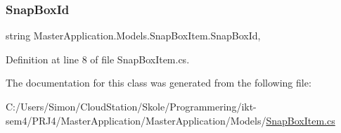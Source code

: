 \subsubsection{\texorpdfstring{Snap\+Box\+Id}{SnapBoxId}}
{\footnotesize\ttfamily string Master\+Application.\+Models.\+Snap\+Box\+Item.\+Snap\+Box\+Id\hspace{0.3cm}{\ttfamily [get]}, {\ttfamily [set]}}



Definition at line 8 of file Snap\+Box\+Item.\+cs.



The documentation for this class was generated from the following file\+:\begin{DoxyCompactItemize}
\item 
C\+:/\+Users/\+Simon/\+Cloud\+Station/\+Skole/\+Programmering/ikt-\/sem4/\+P\+R\+J4/\+Master\+Application/\+Master\+Application/\+Models/\mbox{\hyperlink{_master_application_2_master_application_2_models_2_snap_box_item_8cs}{Snap\+Box\+Item.\+cs}}\end{DoxyCompactItemize}

